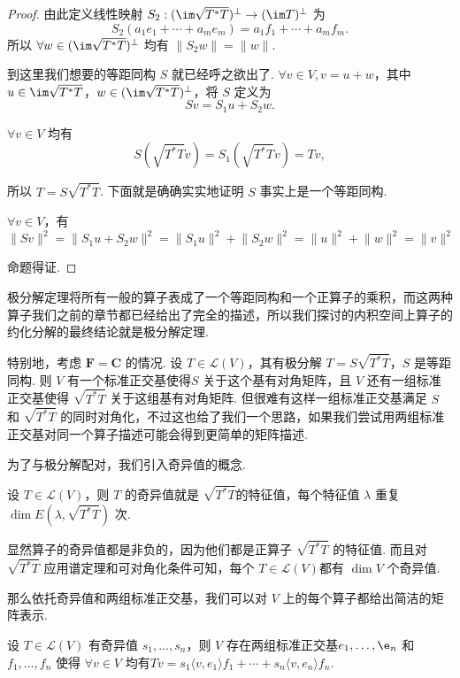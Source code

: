 \begin{proof}
    由此定义线性映射 $ S_2: (\im \sqrt{T^*T})^{\perp} \rightarrow (\im T)^{\perp} $ 为
    \[ S_2(a_1e_1 + \cdots + a_me_m) = a_1f_1 + \cdots + a_mf_m. \]
    所以 $ \forall w \in (\im \sqrt{T^*T})^{\perp} $ 均有 $ \lVert S_2w \rVert = \lVert w \rVert $.

    到这里我们想要的等距同构 $ S $ 就已经呼之欲出了. $ \forall v \in V, v = u + w $，其中 $ u \in \im \sqrt{T^*T} $，$ w \in (\im \sqrt{T^*T})^{\perp} $，将 $ S $ 定义为
    \[ Sv = S_1u + S_2w. \]

    $ \forall v \in V $ 均有
    \[ S(\sqrt{T^*T}v) = S_1(\sqrt{T^*T}v) = Tv, \]

    所以 $ T = S\sqrt{T^*T} $. 下面就是确确实实地证明 $ S $ 事实上是一个等距同构.

    $ \forall v \in V $，有
    \[ \lVert Sv \rVert^2 = \lVert S_1u + S_2w \rVert^2     = \lVert S_1u \rVert^2 + \lVert S_2w \rVert^2 = \lVert u \rVert^2 + \lVert w \rVert^2 = \lVert v \rVert^2 \]

    命题得证.
\end{proof}

极分解定理将所有一般的算子表成了一个等距同构和一个正算子的乘积，而这两种算子我们之前的章节都已经给出了完全的描述，所以我们探讨的内积空间上算子的约化分解的最终结论就是极分解定理.

特别地，考虑 $ \mathbf{F} = \mathbf{C} $ 的情况. 设 $ T \in \mathcal{L}(V) $，其有极分解 $ T = S\sqrt{T^*T} $，$ S $ 是等距同构. 则 $ V $ 有一个标准正交基使得$ S $ 关于这个基有对角矩阵，且 $ V $ 还有一组标准正交基使得 $ \sqrt{T^*T} $ 关于这组基有对角矩阵. 但很难有这样一组标准正交基满足 $ S $ 和 $ \sqrt{T^*T} $ 的同时对角化，不过这也给了我们一个思路，如果我们尝试用两组标准正交基对同一个算子描述可能会得到更简单的矩阵描述.

为了与极分解配对，我们引入奇异值的概念.

\begin{definition}[奇异值] 
    设 $ T \in \mathcal{L}(V) $，则 $ T $ 的奇异值就是 $ \sqrt{T^*T} $的特征值，每个特征值 $ \lambda $ 重复 $ \dim E(\lambda, \sqrt{T^*T}) $ 次.
\end{definition}

显然算子的奇异值都是非负的，因为他们都是正算子 $ \sqrt{T^*T} $ 的特征值. 而且对 $ \sqrt{T^*T} $ 应用谱定理和可对角化条件可知，每个 $ T \in \mathcal{L}(V) $都有 $ \dim V $ 个奇异值.

那么依托奇异值和两组标准正交基，我们可以对 $ V $ 上的每个算子都给出简洁的矩阵表示.

\begin{theorem}[奇异值分解] 
    设 $ T \in \mathcal{L}(V) $ 有奇异值 $ s_1, \ldots , s_n $，则 $ V $ 存在两组标准正交基$ e_1, \ldots, \e_n $ 和 $ f_1, \ldots, f_n $ 使得 $ \forall v \in V $ 均有$ Tv = s_1 \langle v, e_1 \rangle f_1 + \cdots + s_n \langle v, e_n \rangle f_n $.
\end{theorem}

